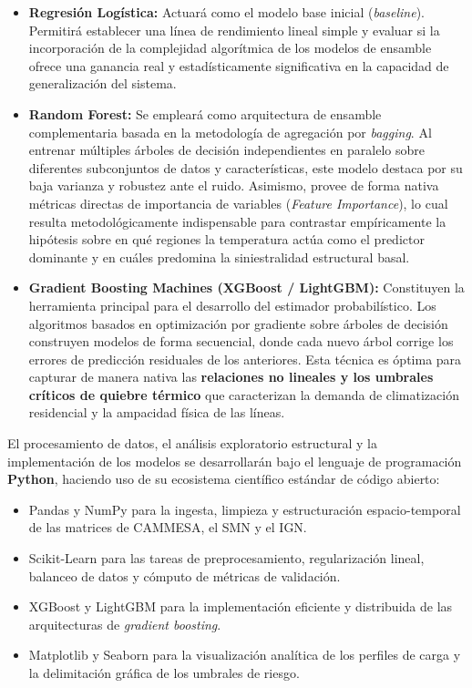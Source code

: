 \begin{itemize}
\item
  \textbf{Regresión Logística:} Actuará como el modelo base inicial (\emph{baseline}). Permitirá establecer una línea de rendimiento lineal simple y evaluar si la incorporación de la complejidad algorítmica de los modelos de ensamble ofrece una ganancia real y estadísticamente significativa en la capacidad de generalización del sistema.
\item
  \textbf{Random Forest:} Se empleará como arquitectura de ensamble complementaria basada en la metodología de agregación por \emph{bagging}. Al entrenar múltiples árboles de decisión independientes en paralelo sobre diferentes subconjuntos de datos y características, este modelo destaca por su baja varianza y robustez ante el ruido. Asimismo, provee de forma nativa métricas directas de importancia de variables (\emph{Feature Importance}), lo cual resulta metodológicamente indispensable para contrastar empíricamente la hipótesis sobre en qué regiones la temperatura actúa como el predictor dominante y en cuáles predomina la siniestralidad estructural basal.
\item
  \textbf{Gradient Boosting Machines (XGBoost / LightGBM):} Constituyen la herramienta principal para el desarrollo del estimador probabilístico. Los algoritmos basados en optimización por gradiente sobre árboles de decisión construyen modelos de forma secuencial, donde cada nuevo árbol corrige los errores de predicción residuales de los anteriores. Esta técnica es óptima para capturar de manera nativa las \textbf{relaciones no lineales y los umbrales críticos de quiebre térmico} que caracterizan la demanda de climatización residencial y la ampacidad física de las líneas.
\end{itemize}

El procesamiento de datos, el análisis exploratorio estructural y la implementación de los modelos se desarrollarán bajo el lenguaje de programación \textbf{Python}, haciendo uso de su ecosistema científico estándar de código abierto:

\begin{itemize}
\item
  Pandas y NumPy para la ingesta, limpieza y estructuración espacio-temporal de las matrices de CAMMESA, el SMN y el IGN.
\item
  Scikit-Learn para las tareas de preprocesamiento, regularización lineal, balanceo de datos y cómputo de métricas de validación.
\item
  XGBoost y LightGBM para la implementación eficiente y distribuida de las arquitecturas de \emph{gradient boosting}.
\item
  Matplotlib y Seaborn para la visualización analítica de los perfiles de carga y la delimitación gráfica de los umbrales de riesgo.
\end{itemize}

